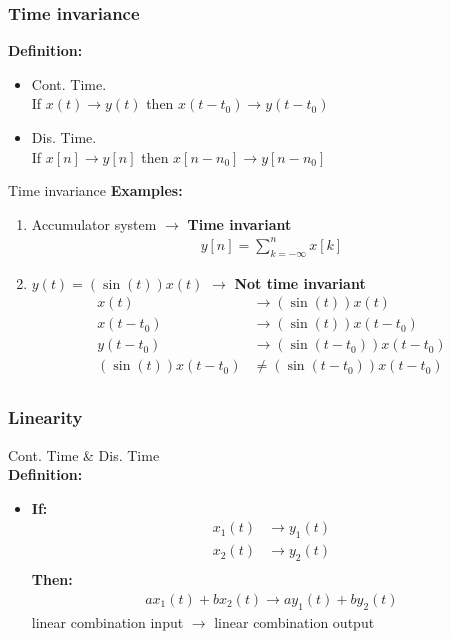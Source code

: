 \documentclass[pdflatex,compress,mathserif]{beamer}
\begin{document}
\begin{frame}
	\frametitle{Time invariance}
	\textbf{Definition:}
	\begin{itemize}
		\item Cont. Time.\\
		If $ x(t) \longrightarrow y(t) $ then $ x(t-t_0) \longrightarrow y(t-t_0) $
		\item Dis. Time.\\
		If $ x[n] \longrightarrow y[n] $ then $ x[n-n_0] \longrightarrow y[n-n_0] $
	\end{itemize}
\end{frame}

\begin{frame}{Time invariance}
	\textbf{Examples:}
	\begin{enumerate}
		\item Accumulator system $ \longrightarrow $ \textbf{Time invariant}
		\begin{align*}
			y[n] = \sum_{k=-\infty}^{n}x[k]
		\end{align*}
		\item $ y(t) = (\sin(t)) x(t) $ $\longrightarrow$ \textbf{Not time invariant}
		\begin{align*}
			x(t) & \rightarrow (\sin (t)) x(t) \\
			x(t-t_0) & \rightarrow (\sin (t)) x(t-t_0) \\
			y(t-t_0) & \rightarrow (\sin (t-t_0)) x(t-t_0) \\
			(\sin (t)) x(t-t_0) & \neq (\sin (t-t_0)) x(t-t_0) \\
		\end{align*}
	\end{enumerate}
\end{frame}

\begin{frame}
	\frametitle{Linearity}
	Cont. Time \& Dis. Time\\
	\textbf{Definition:}\\
	\begin{itemize}
		\item[] \textbf{If:}
		\begin{align*}
		x_1(t) &\rightarrow y_1(t) \\
		x_2(t) &\rightarrow y_2(t) \\
		\end{align*}
		\textbf{Then:}
		\begin{align*}
		ax_1(t) + bx_2(t) \rightarrow ay_1(t) + by_2(t)
		\end{align*}
		linear combination input $\rightarrow$ linear combination output
	\end{itemize}
\end{frame}
\end{document}
